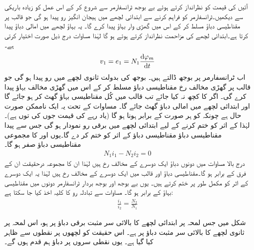 آئیں  کی قیمت کو نظرانداز کرتے ہوئے بے بوجھ ٹرانسفارمر سے شروع کر کے اس عمل کو زیادہ باریکی سے دیکھیں۔ٹرانسفارمر کو  فراہم کرنے سے ابتدائی لچھے میں ہیجان انگیز رو  پیدا ہو گی  جو قالب پر  مقناطیسی دباؤ مسلط  کر کے اس میں گھڑی  وار     بہاؤ  پیدا کرے گا۔ یہ بہاؤ  لچھے میں امالی دباؤ  پیدا کرتا ہے۔ابتدائی لچھے کی مزاحمت نظرانداز کرتے ہوئے  ہو گا  لہٰذا  مساوات  درج ذیل صورت اختیار کرتی ہے۔
\begin{align}\label{مساوات_ٹرانسفارمر_دباو_برابر_بہاو_تفرق_ب}
v_1=e_1=N_1 \frac{\dif \varphi_m}{\dif t}
\end{align}
اب ٹرانسفارمر پر  بوجھ ڈالتے ہیں۔  بوجھ کی بدولت ثانوی لچھے میں  رو پیدا ہو گی جو قالب پر گھڑی  مخالف رخ مقناطیسی دباؤ  مسلط کر کے اس میں گھڑی  مخالف   بہاؤ  پیدا کرے گی۔ اگر  کا کچھ نہ کیا جائے تب  قالب میں کُل مقناطیسی بہاؤ گھٹ کر  ہو جائے گا اور ابتدائی لچھے میں امالی دباؤ گھٹ جائے گا۔ مساوات  کے تحت یہ ایک ناممکن صورت حال ہے چونکہ  کو ہر صورت  کے برابر ہونا ہو گا (یاد رہے  کی قیمت جوں کی توں ہے)۔ لہٰذا   کے اثر کو ختم کرنے کے لیے ابتدائی لچھے میں برقی رو  نمودار ہو گی جس سے پیدا مقناطیسی دباؤ  مقناطیسی دباؤ   کے اثر کو ختم کر دے گا۔یوں  اور  کا مجموعی مقناطیسی دباؤ صفر ہو گا۔
\begin{align}\label{مساوات_ٹرانسفارمر_رو_تناسب}
N_1 i_1-N_2 i_2=0
\end{align}
درج بالا مساوات میں دونوں دباؤ  ایک دوسرے کے مخالف  رخ ہیں لہٰذا ان کا مجموعہ درحقیقت ان کے فرق کے برابر ہو گا۔مقناطیسی دباؤ  اور  قالب میں ایک دوسرے کے مخالف رخ ہیں لہٰذا یہ ایک دوسرے کے اثر کو مکمل طور پر ختم کرتے ہیں۔ یوں بے بوجھ اور بوجھ بردار ٹرانسفارمر دونوں میں  مقناطیسی بہاؤ   کے برابر  ہو گا۔ مساوات  سے تبادلہ رو کا کلیہ اخذ کیا جا سکتا ہے:
\begin{align}\label{مساوات_ٹرانسفارمر_برقی_رو_اور_چکر_شرح}
\frac{i_1}{i_2}=\frac{N_2}{N_1}
\end{align}
%

شکل   میں جس لمحہ پر ابتدائی لچھے کا بالائی سر مثبت برقی دباؤ پر ہو، اس لمحہ پر ثانوی لچھے کا بالائی سر مثبت دباؤ پر ہے۔ اس حقیقت کو لچھوں پر نقطوں سے ظاہر کیا گیا ہے۔ یوں نقطی سروں پر دباؤ ہم قدم ہوں گے۔

